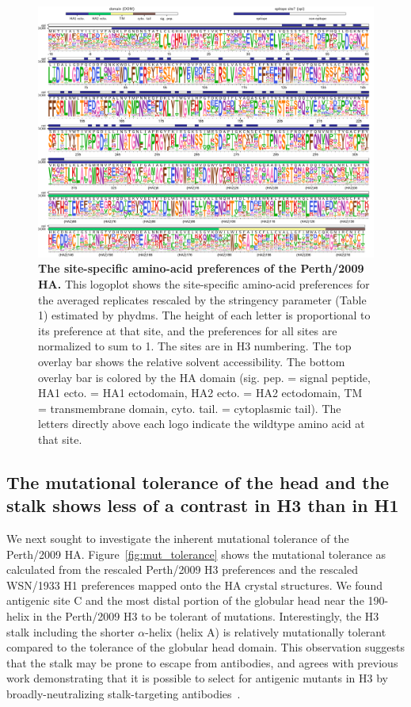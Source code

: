 \documentclass[9pt,twocolumn,twoside]{pnas-new}
\begin{document}
\begin{figure}
\centering
\includegraphics[width=17cm]{figs/prefslogoplot/rescaled-avgprefs_prefs.pdf}
\caption{\label{fig:logoplot}
{\bf The site-specific amino-acid preferences of the Perth/2009 HA.}
This logoplot shows the site-specific amino-acid preferences for the averaged replicates rescaled by the stringency parameter (Table 1) estimated by phydms.
The height of each letter is proportional to its preference at that site, and the preferences for all sites are normalized to sum to 1.
The sites are in H3 numbering.
The top overlay bar shows the relative solvent accessibility.
The bottom overlay bar is colored by the HA domain (sig. pep. = signal peptide, HA1 ecto. = HA1 ectodomain, HA2 ecto. = HA2 ectodomain, TM = transmembrane domain, cyto. tail. = cytoplasmic tail).
The letters directly above each logo indicate the wildtype amino acid at that site.
}
\end{figure}

\subsection*{The mutational tolerance of the head and the stalk shows less of a contrast in H3 than in H1}
We next sought to investigate the inherent mutational tolerance of the Perth/2009 HA. 
Figure~\ref{fig:mut_tolerance} shows the mutational tolerance as calculated from the rescaled Perth/2009 H3 preferences and the rescaled WSN/1933 H1 preferences mapped onto the HA crystal structures.
We found antigenic site C and the most distal portion of the globular head near the 190-helix in the Perth/2009 H3 to be tolerant of mutations.
Interestingly, the H3 stalk including the shorter $\alpha$-helix (helix A) is relatively mutationally tolerant compared to the tolerance of the globular head domain. 
This observation suggests that the stalk may be prone to escape from antibodies, and agrees with previous work demonstrating that it is possible to select for antigenic mutants in H3 by broadly-neutralizing stalk-targeting antibodies~\cite{ekiert2011highly, friesen2014common, chai2016two, yamayoshi2017human}.
\end{document}
